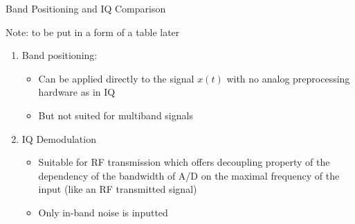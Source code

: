 \documentclass{beamer}
\begin{document}
\begin{frame}[t]{Band Positioning and IQ Comparison}

Note: to be put in a form of a table later

\begin{enumerate}

\item Band positioning:
	
	\begin{itemize}
	\item Can be applied directly to the signal $x(t)$ with no analog preprocessing hardware as in IQ
	
	\item But not suited for multiband signals
	\end{itemize}



\item IQ Demodulation

	\begin{itemize}
	\item Suitable for RF transmission which offers decoupling property of the dependency of the bandwidth of A/D on the maximal frequency of the input (like an RF transmitted signal) 
	
	
	\item Only in-band noise is inputted 
	\end{itemize}


\end{enumerate}


\end{frame}
\end{document}
